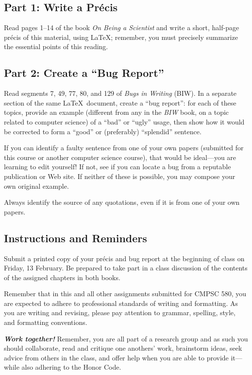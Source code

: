 

\usepackage[compact]{titlesec}




\subsection*{Part 1: Write a Pr\'{e}cis}

Read pages 1--14 of the book {\em On Being a Scientist} and write a short, half-page pr\'{e}cis of this material, using
\LaTeX; remember, you must precisely summarize the essential points of this reading.

\subsection*{Part 2: Create a ``Bug Report''}
Read segments 7, 49, 77, 80, and 129 of {\em Bugs in Writing} (BIW). 
In a separate section of the same \LaTeX\ document, create a
``bug report'': for each
of these topics, provide an example (different from any in the {\em BIW}
book, on a topic
related to computer science) of a ``bad'' or ``ugly'' usage, then show
how it would be corrected to form a ``good'' or (preferably) ``splendid''
sentence.

If you can identify a faulty sentence from one of your own papers (submitted
for this course or another computer science course), that would be ideal---you
    are learning to edit yourself!
If not, see if you can locate a bug from a reputable publication or
Web site. If neither of these is possible, you may compose your own
original example.

Always identify the source of any quotations, even if it is from one of your
own papers.

\subsection*{Instructions and Reminders}

Submit a printed copy of your pr\'{e}cis and bug report at the beginning of class on Friday, 13 February. Be prepared to
take part in a class discussion of the contents of the assigned chapters in both books.

Remember that in this and all other assignments submitted for CMPSC 580, you are expected to adhere to professional
standards of writing and formatting. As you are writing and revising, please pay attention to grammar, spelling, style,
and formatting conventions.

{\large\color{black}\textbf{\textit{Work together!}}} Remember, you are all part of a research group and as such you
should collaborate, read and critique one anothers' work, brainstorm ideas, seek advice from others in the class, and offer
help when you are able to provide it---while also adhering to the Honor Code.


